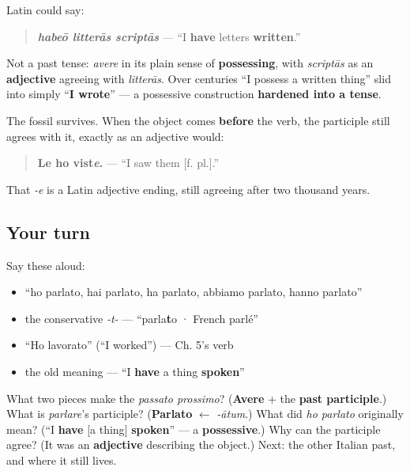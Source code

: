 \begin{cousinweb}
Latin could say:

\begin{quote}
\emph{\textbf{habeō litterās scriptās}} — \textquotedblleft{}I \textbf{have} letters \textbf{written}.\textquotedblright{}
\end{quote}

Not a past tense: \emph{avere} in its plain sense of \textbf{possessing}, with \emph{scriptās} as an \textbf{adjective} agreeing with \emph{litterās}. Over centuries \textquotedblleft{}I possess a written thing\textquotedblright{} slid into simply \textquotedblleft{}\textbf{I wrote}\textquotedblright{} — a possessive construction \textbf{hardened into a tense}.

The fossil survives. When the object comes \textbf{before} the verb, the participle still agrees with it, exactly as an adjective would:

\begin{quote}
\textbf{Le ho vist\emph{e}.} — \textquotedblleft{}I saw them {[}f. pl.{]}.\textquotedblright{}
\end{quote}

That \emph{-e} is a Latin adjective ending, still agreeing after two thousand years.
\end{cousinweb}

\subsection*{Your turn}
Say these aloud:

\begin{itemize}
\raggedright
  \item \textquotedblleft{}ho parlato, hai parlato, ha parlato, abbiamo parlato, hanno parlato\textquotedblright{}
  \item the conservative \emph{-t-} — \textquotedblleft{}parla\textbf{t}o · French parlé\textquotedblright{}
  \item \textquotedblleft{}Ho lavorato\textquotedblright{} (\textquotedblleft{}I worked\textquotedblright{}) — Ch. 5's verb
  \item the old meaning — \textquotedblleft{}I \textbf{have} a thing \textbf{spoken}\textquotedblright{}
\end{itemize}

\begin{tcolorbox}[breakable,colback=teal!4,colframe=teal!35!black,title={Before you move on}]
What two pieces make the \emph{passato prossimo}? (\textbf{Avere} + the \textbf{past participle}.) What is \emph{parlare}'s participle? (\textbf{Parlato} $\leftarrow$ \emph{-ātum}.) What did \emph{ho parlato} originally mean? (\textquotedblleft{}I \textbf{have} {[}a thing{]} \textbf{spoken}\textquotedblright{} — a \textbf{possessive}.) Why can the participle agree? (It was an \textbf{adjective} describing the object.) Next: the other Italian past, and where it still lives.
\end{tcolorbox}
